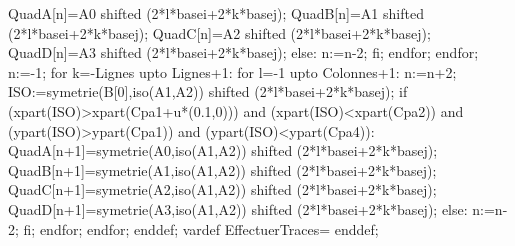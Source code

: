 {  QuadA[n]=A0 shifted (2*l*basei+2*k*basej);
  QuadB[n]=A1 shifted (2*l*basei+2*k*basej);
  QuadC[n]=A2 shifted (2*l*basei+2*k*basej);
  QuadD[n]=A3 shifted (2*l*basei+2*k*basej);
  else:
  n:=n-2;
  fi;
  endfor;
  endfor;
  n:=-1;
  for k=-Lignes upto Lignes+1:
  for l=-1 upto Colonnes+1:
  n:=n+2;
  ISO:=symetrie(B[0],iso(A1,A2)) shifted (2*l*basei+2*k*basej);
  if (xpart(ISO)>xpart(Cpa1+u*(0.1,0))) and (xpart(ISO)<xpart(Cpa2)) and (ypart(ISO)>ypart(Cpa1)) and (ypart(ISO)<ypart(Cpa4)):
  QuadA[n+1]=symetrie(A0,iso(A1,A2)) shifted (2*l*basei+2*k*basej);
  QuadB[n+1]=symetrie(A1,iso(A1,A2)) shifted (2*l*basei+2*k*basej);
  QuadC[n+1]=symetrie(A2,iso(A1,A2)) shifted (2*l*basei+2*k*basej);
  QuadD[n+1]=symetrie(A3,iso(A1,A2)) shifted (2*l*basei+2*k*basej);
  else:
  n:=n-2;
  fi;
  endfor;
  endfor;
  enddef;
  vardef EffectuerTraces=
  enddef;
}

